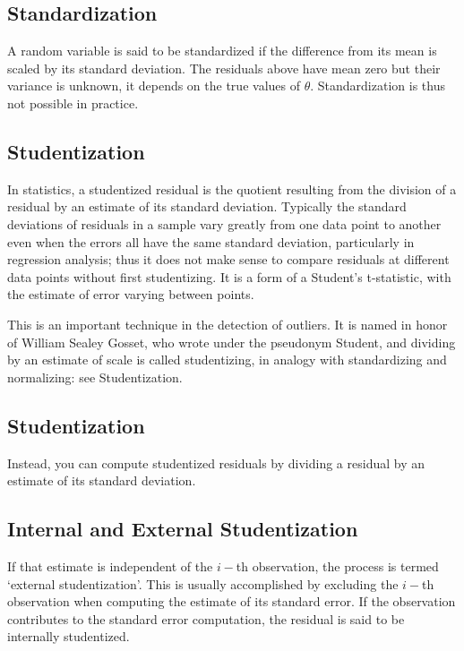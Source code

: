 \documentclass[a4paper,12pt]{article}
\begin{document}
\subsection{Standardization} %

A random variable is said to be standardized if the difference from its mean is scaled by its standard deviation. The residuals above have mean zero but their variance is unknown, it depends on the true values of $\theta$. Standardization is thus not possible in practice.

\subsection{Studentization}
In statistics, a studentized residual is the quotient resulting from the division of a residual by an estimate of its standard deviation. Typically the standard deviations of residuals in a sample vary greatly from one data point to another even when the errors all have the same standard deviation, particularly in regression analysis; thus it does not make sense to compare residuals at different data points without first studentizing. It is a form of a Student's t-statistic, with the estimate of error varying between points.

This is an important technique in the detection of outliers. It is named in honor of William Sealey Gosset, who wrote under the pseudonym Student, and dividing by an estimate of scale is called studentizing, in analogy with standardizing and normalizing: see Studentization.

\subsection{Studentization} %
Instead, you can compute studentized residuals by dividing a residual by an estimate of its standard deviation. 

\subsection{Internal and External Studentization} %
If that estimate is independent of the $i-$th observation, the process is termed `external studentization'. This is usually accomplished by excluding the $i-$th observation when computing the estimate of its standard error. If the observation contributes to the
standard error computation, the residual is said to be internally studentized.
\end{document}
